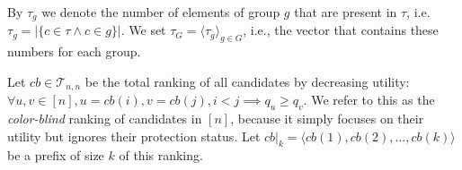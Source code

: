By $\tau_g$ we denote the number of elements of group $ g $ that are present in $\tau$, i.e. $\tau_g = | \{ c \in \tau \wedge c \in g \} |$.
%
We set $ \tau_G = \langle\tau_g\rangle_{g \in G}$, i.e., the vector that contains these numbers for each group.
%

Let $cb \in {\mathcal T}_{n,n}$ be the total ranking of all candidates by decreasing utility: $\forall u,v \in [n], u=cb(i), v = cb(j), i < j \implies q_u \ge q_v$.
%
%
We refer to this as the \emph{color-blind} ranking of candidates in $[n]$, because it simply focuses on their utility but ignores their protection status.
%
Let $\textit{cb}|_k = \langle \textit{cb}(1), \textit{cb}(2), \ldots, \textit{cb}(k) \rangle$ be a prefix of size $k$ of this ranking. \label{concept:color-blind-ranking}
%

